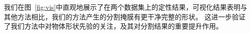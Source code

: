 
我们在图~\ref{fig:vis}中直观地展示了在两个数据集上的定性结果，可视化结果表明与其他方法相比，我们的方法产生的分割掩膜有更干净完整的形状。
这进一步验证了我们方法中对物体形状先验的关注，及其对分割结果的重要提升作用。


